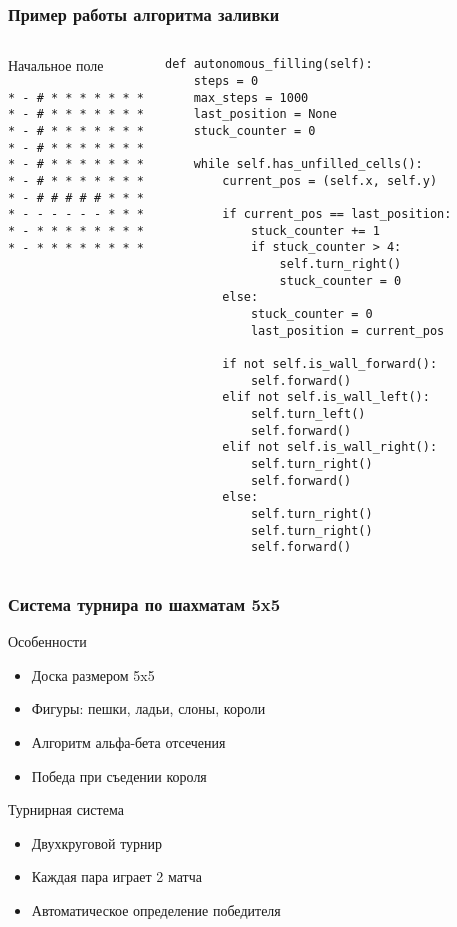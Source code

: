 \documentclass[14pt]{beamer}
\begin{document}
\begin{frame}[fragile]
\frametitle{Пример работы алгоритма заливки}
\begin{columns}
\begin{block}{Начальное поле}
\begin{verbatim}
* - # * * * * * * *
* - # * * * * * * *
* - # * * * * * * *
* - # * * * * * * *
* - # * * * * * * *
* - # * * * * * * *
* - # # # # # * * *
* - - - - - - * * *
* - * * * * * * * *
* - * * * * * * * *
\end{verbatim}
\end{block}

\begin{lstlisting}[basicstyle=\tiny]
def autonomous_filling(self):
    steps = 0
    max_steps = 1000
    last_position = None
    stuck_counter = 0
    
    while self.has_unfilled_cells():
        current_pos = (self.x, self.y)
        
        if current_pos == last_position:
            stuck_counter += 1
            if stuck_counter > 4:
                self.turn_right()
                stuck_counter = 0
        else:
            stuck_counter = 0
            last_position = current_pos
        
        if not self.is_wall_forward():
            self.forward()
        elif not self.is_wall_left():
            self.turn_left()
            self.forward()
        elif not self.is_wall_right():
            self.turn_right()
            self.forward()
        else:
            self.turn_right()
            self.turn_right()
            self.forward()
\end{lstlisting}
\end{columns}
\end{frame}

\begin{frame}
\frametitle{Система турнира по шахматам 5x5}
\begin{block}{Особенности}
\begin{itemize}
\item Доска размером 5x5
\item Фигуры: пешки, ладьи, слоны, короли
\item Алгоритм альфа-бета отсечения
\item Победа при съедении короля
\end{itemize}
\end{block}

\begin{block}{Турнирная система}
\begin{itemize}
\item Двухкруговой турнир
\item Каждая пара играет 2 матча
\item Автоматическое определение победителя
\end{itemize}
\end{block}
\end{frame}
\end{document}
